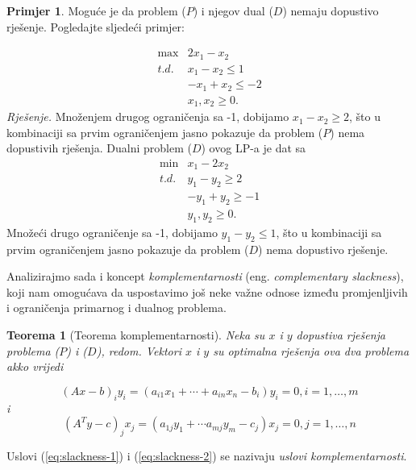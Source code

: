 \documentclass[a4paper, utf8, 11pt, colorlinks]{book}
\newtheorem{thm}{Teorema}[chapter]
\theoremstyle{definition}
\newtheorem{primjer}{Primjer}[chapter]
\begin{document}
\begin{primjer} Moguće je da problem ($P$) i njegov   dual ($D$) nemaju dopustivo rješenje. Pogledajte sljedeći primjer:
	\end{primjer}
$$\begin{array}{cc}
    \max          & 2 x_1 - x_2 \\
     {t.d. }      & x_1 - x_2 \leq 1 \\
                  & -x_1 + x_2 \leq -2 \\
                  & x_1, x_2 \geq 0.
\end{array}$$
\emph{Rješenje.} Množenjem drugog ograničenja sa -1, dobijamo $x_1 - x_2 \geq 2$, što u kombinaciji sa prvim ograničenjem jasno pokazuje da problem ($P$) nema dopustivih rješenja. Dualni problem ($D$) ovog LP-a je dat sa 
$$\begin{array}{cc}
	\min          &x_1 - 2x_2 \\
	{t.d. }       & y_1 -y_2 \geq 2 \\
				  & -y_1 + y_2 \geq -1 \\
				  & y_1, y_2 \geq 0.
\end{array}$$
Množeći drugo ograničenje sa -1, dobijamo $y_1 -y_2 \leq 1$, što u kombinaciji sa prvim ograničenjem jasno pokazuje da problem ($D$) nema dopustivo rješenje. ~

Analizirajmo sada i koncept  \emph{komplementarnosti} (eng. \emph{complementary slackness}), koji nam omogućava da uspostavimo još neke važne odnose između promjenljivih i ograničenja primarnog i dualnog problema. 
\begin{thm}[Teorema komplementarnosti]
	
      Neka su $x$ i $y$ dopustiva rješenja problema ($P$) i  ($D$), redom. Vektori $x$ i $y$ su optimalna rješenja ova dva problema akko vrijedi 
      
            \begin{equation}\label{eq:slackness-2} 
      	(Ax - b)_i y_i = (a_{i1}x_1 + \cdots + a_{in}x_n - b_i)y_i = 0, i=1,\ldots,m 
      \end{equation} 
   i 
      \begin{equation}\label{eq:slackness-1} 
           (A^Ty - c)_j x_j =  ( a_{1 j}y_1 + \cdots a_{m j}y_m - c_j  ) x_j =  
           0, j=1,\ldots,n 
      \end{equation}    

\end{thm} 
Uslovi (\ref{eq:slackness-1}) i (\ref{eq:slackness-2}) se nazivaju \emph{uslovi komplementarnosti}. 
\end{document}
